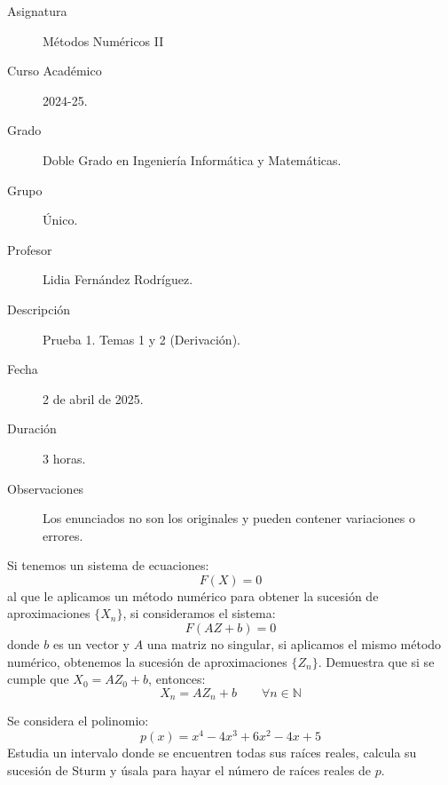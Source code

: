 \documentclass[12pt]{article}
\begin{document}

    
    

    \begin{description}
        \item[Asignatura] Métodos Numéricos II
        \item[Curso Académico] 2024-25.
        \item[Grado] Doble Grado en Ingeniería Informática y Matemáticas.
        \item[Grupo] Único.
        \item[Profesor] Lidia Fernández Rodríguez.
        \item[Descripción] Prueba 1. Temas 1 y 2 (Derivación).
        \item[Fecha] 2 de abril de 2025.
        \item[Duración] 3 horas.
        \item[Observaciones] Los enunciados no son los originales y pueden contener variaciones o errores. 
    
    \end{description}
    \newpage
    

    \begin{ejercicio}
        Si tenemos un sistema de ecuaciones:
        \begin{equation*}
            F(X) = 0
        \end{equation*}
        al que le aplicamos un método numérico para obtener la sucesión de aproximaciones $\{X_n\}$, si consideramos el sistema:
        \begin{equation*}
            F(AZ+b) = 0
        \end{equation*}
        donde $b$ es un vector y $A$ una matriz no singular, si aplicamos el mismo método numérico, obtenemos la sucesión de aproximaciones $\{Z_n\}$. Demuestra que si se cumple que $X_0 = AZ_0 + b$, entonces:
        \begin{equation*}
            X_n = AZ_n + b \qquad \forall n\in \mathbb{N}
        \end{equation*}
    \end{ejercicio}

    \begin{ejercicio}
        Se considera el polinomio:
        \begin{equation*}
            p(x) = x^4-4x^3+6x^2-4x+5
        \end{equation*}
        Estudia un intervalo donde se encuentren todas sus raíces reales, calcula su sucesión de Sturm y úsala para hayar el número de raíces reales de $p$.
    \end{ejercicio}
\end{document}
